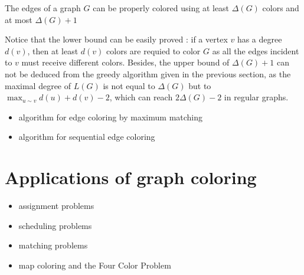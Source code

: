 \begin{theorem}[Vizing]
The edges of a graph $G$ can be properly colored using at least $\Delta(G)$ colors and at most $\Delta(G)+1$
\end{theorem}
Notice that the lower bound can be easily proved : if a vertex $v$ has a degree $d(v)$, then at least $d(v)$ colors are requied to color $G$ as all the edges incident to $v$ must receive different colors. Besides, the upper bound of $\Delta(G)+1$ can not be deduced from the greedy algorithm given in the previous section, as the maximal degree of $L(G)$ is not equal to $\Delta(G)$ but to $\displaystyle \max_{u\sim v}d(u)+d(v)-2$, which can reach $2\Delta(G)-2$ in regular graphs.


\begin{itemize}
\item algorithm for edge coloring by maximum matching
\item algorithm for sequential edge coloring
\end{itemize}



\section{Applications of graph coloring}

\begin{itemize}
\item assignment problems

\item scheduling problems

\item matching problems

\item map coloring and the Four Color Problem
\end{itemize}
